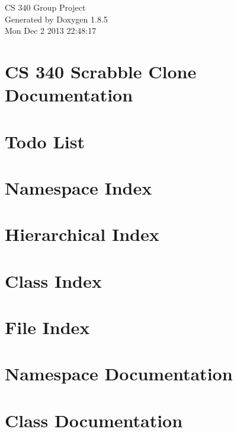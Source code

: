 \documentclass[twoside]{book}
\newcommand{\clearemptydoublepage}{%
  \newpage{\pagestyle{empty}\cleardoublepage}%
}
\begin{document}
\hypersetup{pageanchor=false}
\begin{titlepage}
\vspace*{7cm}
\begin{center}%
{\Large C\-S 340 Group Project }\\
\vspace*{1cm}
{\large Generated by Doxygen 1.8.5}\\
\vspace*{0.5cm}
{\small Mon Dec 2 2013 22:48:17}\\
\end{center}
\end{titlepage}
\clearemptydoublepage
\tableofcontents
\clearemptydoublepage
{}
\hypersetup{pageanchor=true}

\chapter{C\-S 340 Scrabble Clone Documentation}
\label{index}\hypertarget{index}{}
\chapter{Todo List}
\label{todo}
\hypertarget{todo}{}

\chapter{Namespace Index}

\chapter{Hierarchical Index}

\chapter{Class Index}

\chapter{File Index}

\chapter{Namespace Documentation}

\chapter{Class Documentation}




















\end{document}
